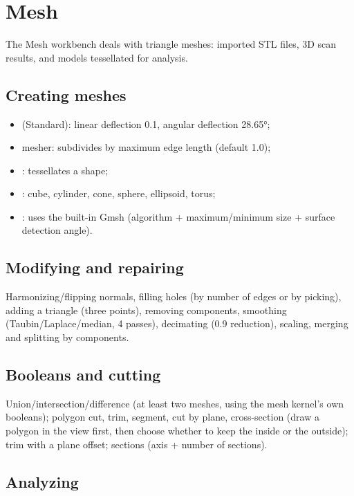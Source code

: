\section{Mesh}

The Mesh workbench deals with triangle meshes: imported STL files, 3D scan results, and models
tessellated for analysis.

\subsection{Creating meshes}

\begin{itemize}
  \item {} (Standard): linear deflection 0.1, angular deflection 28.65°;
  \item {} mesher: subdivides by maximum edge length (default 1.0);
  \item {}: tessellates a shape;
  \item {}: cube, cylinder, cone, sphere, ellipsoid, torus;
  \item {}: uses the built-in Gmsh (algorithm + maximum/minimum size + surface detection angle).
\end{itemize}

\subsection{Modifying and repairing}

Harmonizing/flipping normals, filling holes (by number of edges or by picking), adding a triangle
(three points), removing components, smoothing (Taubin/Laplace/median, 4 passes), decimating
(0.9 reduction), scaling, merging and splitting by components.

\subsection{Booleans and cutting}

Union/intersection/difference (at least two meshes, using the mesh kernel's own booleans); polygon
cut, trim, segment, cut by plane, cross-section (draw a polygon in the view first, then choose
whether to keep the inside or the outside); trim with a plane offset; sections (axis + number of
sections).

\subsection{Analyzing}

